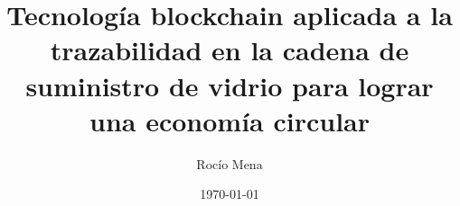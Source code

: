 \documentclass{article}
\title{Tecnología blockchain aplicada a la trazabilidad en la cadena de suministro de vidrio para lograr una economía circular}
\author{Rocío Mena}
\date{\today}
\begin{document}
\maketitle













\nocite{*} %

\printbibliography %
\end{document}
